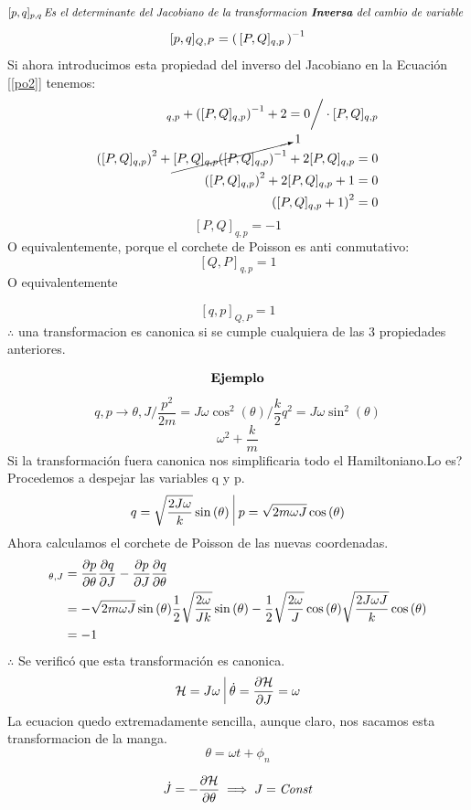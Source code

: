 \documentclass[12pt]{article}
\newcommand{\en}[1]{\[\boxed{#1}\]}
\newcommand{\coss}[1]{\cos{\qty(#1)}}
\newcommand{\sinn}[1]{\sin{\qty(#1)}}
\newcommand{\ej}{\[\textrm{\textbf{Ejemplo}} \]}
\newcommand{\eqreff}[1]{Ecuación [\ref{#1}]}
\begin{document}
$$[p,q]_{p,q}\, \textit{Es el determinante del Jacobiano de la transformacion \textbf{Inversa} del cambio de variable }$$
$$[p,q]_{Q,P} = \qty(\,[P,Q]_{q,p}\, )^{-1} $$
Si ahora introducimos esta propiedad del inverso del Jacobiano en la \eqreff{po2} tenemos:
\begin{align}
[P,Q]_{q,p}+ \qty([P,Q]_{q,p})^{-1} + 2 =0\bigg/\cdot [P,Q]_{q,p}\\
\qty([P,Q]_{q,p})^2+ \cancelto{1}{[P,Q]_{q,p}\qty([P,Q]_{q,p})^{-1}} + 2 [P,Q]_{q,p} =0\\
\qty([P,Q]_{q,p})^2+ 2 [P,Q]_{q,p} +1 =0\\
\qty([P,Q]_{q,p}+1)^2=0
\end{align}
\en{[P,Q]_{q,p}=-1}
O equivalentemente, porque el corchete de Poisson es anti conmutativo:
\en{[Q,P]_{q,p}=1}
O equivalentemente

\en{[q,p]_{Q,P}=1}
$\therefore$ una transformacion es canonica si se cumple cualquiera de las 3 propiedades anteriores. 
\newpage

\ej
$$q,p \rightarrow \theta,J \bigg/ \frac{p^2}{2m}= J \omega \cos^2{(\theta)} \bigg/ \frac{k}{2}q^2= J \omega \sin^2{(\theta)}$$
$$\omega^2+\frac{k}{m} $$
Si la transformación  fuera canonica nos simplificaria todo el Hamiltoniano.Lo es?\\
Procedemos a despejar las variables q y p.
\begin{align}
q= \sqrt{\frac{2J \omega}{k}} \sinn{\theta}\,\, \vline \,\, p=\sqrt{2m\omega J} \coss{\theta}	\label{op4}
\end{align}
Ahora calculamos el corchete de Poisson de las nuevas coordenadas.\\
\begin{align}
[p,q]_{\theta,J} &= \pdv{p}{\theta} \pdv{q}{J}-\pdv{p}{J} \pdv{q}{\theta}\\
	&=-\sqrt{2m\omega J}\sinn{\theta} \frac{1}{2} \sqrt{\frac{2\omega}{J k}} \sinn{\theta} - \frac{1}{2} \sqrt{\frac{2\omega}{J}} \coss{\theta} \sqrt{\frac{2J\omega J}{k}}\coss{\theta}\\
	&=-1
\end{align}
$\therefore$ Se verificó que esta transformación es canonica.
\begin{align}
\mathcal{H}=J \omega \,\, \vline \,\, \dot{\theta}=\pdv{\mathcal{H}}{J}=\omega	
\end{align}
La ecuacion quedo extremadamente sencilla, aunque claro, nos sacamos esta transformacion de la manga.
$$\theta = \omega t + \phi_n$$


$$\dot{J} = - \pdv{\mathcal{H}}{\theta} \implies J= \textit{Const}$$
\end{document}
